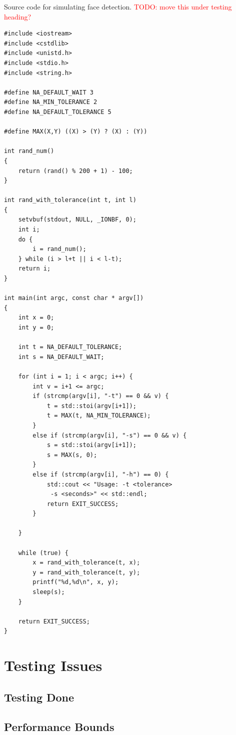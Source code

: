 \documentclass[11pt,a4paper,titlepage]{report}
\begin{document}
Source code for simulating face detection. \textcolor{red}{TODO: move this under testing heading?}

\begin{lstlisting}[frame=single]
#include <iostream>
#include <cstdlib>
#include <unistd.h>
#include <stdio.h>
#include <string.h>

#define NA_DEFAULT_WAIT 3
#define NA_MIN_TOLERANCE 2
#define NA_DEFAULT_TOLERANCE 5

#define MAX(X,Y) ((X) > (Y) ? (X) : (Y))

int rand_num()
{
    return (rand() % 200 + 1) - 100;
}

int rand_with_tolerance(int t, int l)
{
    setvbuf(stdout, NULL, _IONBF, 0);
    int i;
    do {
        i = rand_num();
    } while (i > l+t || i < l-t);
    return i;
}

int main(int argc, const char * argv[])
{
    int x = 0;
    int y = 0;

    int t = NA_DEFAULT_TOLERANCE;
    int s = NA_DEFAULT_WAIT;

    for (int i = 1; i < argc; i++) {
        int v = i+1 <= argc;
        if (strcmp(argv[i], "-t") == 0 && v) {
            t = std::stoi(argv[i+1]);
            t = MAX(t, NA_MIN_TOLERANCE);
        }
        else if (strcmp(argv[i], "-s") == 0 && v) {
            s = std::stoi(argv[i+1]);
            s = MAX(s, 0);
        }
        else if (strcmp(argv[i], "-h") == 0) {
            std::cout << "Usage: -t <tolerance>
             -s <seconds>" << std::endl;
            return EXIT_SUCCESS;
        }

    }

    while (true) {
        x = rand_with_tolerance(t, x);
        y = rand_with_tolerance(t, y);
        printf("%d,%d\n", x, y);
        sleep(s);
    }

    return EXIT_SUCCESS;
}
\end{lstlisting}



\section{Testing Issues}
\subsection{Testing Done}
\subsection{Performance Bounds}
\end{document}
